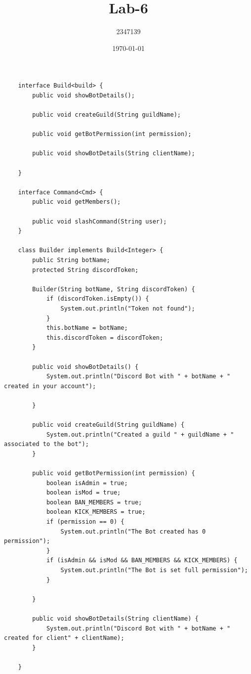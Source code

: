 \documentclass{article}
\title{Lab-6}
\author{2347139}
\date{\today}
\begin{document}
\maketitle
\begin{lstlisting}
    interface Build<build> {
        public void showBotDetails();
    
        public void createGuild(String guildName);
    
        public void getBotPermission(int permission);
    
        public void showBotDetails(String clientName);
    
    }
    
    interface Command<Cmd> {
        public void getMembers();
    
        public void slashCommand(String user);
    }
    
    class Builder implements Build<Integer> {
        public String botName;
        protected String discordToken;
    
        Builder(String botName, String discordToken) {
            if (discordToken.isEmpty()) {
                System.out.println("Token not found");
            }
            this.botName = botName;
            this.discordToken = discordToken;
        }
    
        public void showBotDetails() {
            System.out.println("Discord Bot with " + botName + " created in your account");
    
        }
    
        public void createGuild(String guildName) {
            System.out.println("Created a guild " + guildName + " associated to the bot");
        }
    
        public void getBotPermission(int permission) {
            boolean isAdmin = true;
            boolean isMod = true;
            boolean BAN_MEMBERS = true;
            boolean KICK_MEMBERS = true;
            if (permission == 0) {
                System.out.println("The Bot created has 0 permission");
            }
            if (isAdmin && isMod && BAN_MEMBERS && KICK_MEMBERS) {
                System.out.println("The Bot is set full permission");
            }
    
        }
    
        public void showBotDetails(String clientName) {
            System.out.println("Discord Bot with " + botName + " created for client" + clientName);
        }
    
    }
    

\end{lstlisting}
\end{document}
